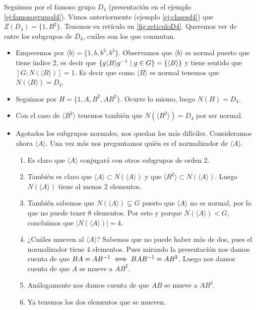 \begin{ej}
	Seguimos por el famoso grupo $D_4$ (presentación en el ejemplo \ref{ej:famosogrupod4}). Vimos anteriormente (ejemplo \ref{ej:clasesd4}) que $Z(D_4) = \{1, B^2\}$. Tenemos su retículo en \ref{fig:reticuloD4}. Queremos ver de entre los subgrupos de $D_4$, cuáles son los que conmutan.
	\begin{itemize}
		\item Empecemos por $\langle b \rangle = \{1, b, b^3, b^3\}$. Observamos que $\langle b \rangle$ es normal puesto que tiene índice 2, es decir que $\{g\langle B \rangle g^{-1} \mid g \in G\} = \{\langle B \rangle\}$ y tiene sentido que $[G:N(\langle B \rangle)] = 1$. Es decir que como $\langle B \rangle$ es normal tenemos que $N(\langle B \rangle) = D_4$.
		\item Seguimos por $H = \{1, A, B^2, AB^2\}$. Ocurre lo mismo, luego $N(H) = D_4$.
		\item Con el caso de $\langle B^2 \rangle$ tenemos también que $N(\langle B^2 \rangle) = D_4$ por ser normal.
		\item Agotados los subgrupos normales, nos quedan los más difíciles. Consideramos ahora $\langle A \rangle$. Una vez más nos preguntamos quién es el normalizador de $\langle A \rangle$.
		\begin{enumerate}
			\item Es claro que $\langle A \rangle$ conjugará con otros subgrupos de orden 2.
			\item También es claro que $\langle A \rangle \subset N(\langle A \rangle)$ y que $\langle B^2 \rangle \subset N(\langle A \rangle)$. Luego $N(\langle A \rangle)$ tiene al menos 2 elementos.
			\item También sabemos que $N(\langle A \rangle) \subsetneq G$ puesto que $\langle A \rangle$ no es normal, por lo que no puede tener 8 elementos. Por esto y porque $N(\langle A \rangle) < G$, concluimos que $|N(\langle A \rangle)| = 4$.
			\item ¿Cuáles mueven al $\langle A \rangle$? Sabemos que no puede haber más de dos, pues el normalizador tiene 4 elementos. Pues mirando la presentación nos damos cuenta de que $BA = AB^{-1} \iff BAB^{-1} = AB^2$. Luego nos damos cuenta de que $A$ se mueve a $AB^2$.
			\item Análogamente nos damos cuenta de que $AB$ se mueve a $AB^3$.
			\item Ya tenemos los dos elementos que se mueven.
		\end{enumerate}
	\end{itemize}
\end{ej}

